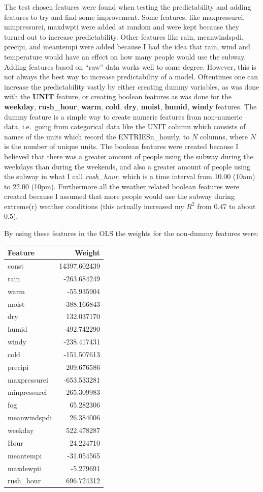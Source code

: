 \documentclass{article}
\begin{document}
The test chosen features were found when testing the predictability and
adding features to try and find some improvement. Some features, like
maxpressurei, minpressurei, maxdwpti were added at random and were kept
because they turned out to increase predictability. Other features like
rain, meanwindspdi, precipi, and meantempi were added because I had the
idea that rain, wind and temperature would have an effect on how many
people would use the subway. Adding features based on ``raw'' data works
well to some degree. However, this is not always the best way to
increase predictability of a model. Oftentimes one can increase the
predictability vastly by either creating dummy variables, as was done
with the \textbf{UNIT} feature, or creating boolean features as was done
for the \textbf{weekday}, \textbf{rush\_hour}, \textbf{warm},
\textbf{cold}, \textbf{dry}, \textbf{moist}, \textbf{humid},
\textbf{windy} features. The dummy feature is a simple way to create
numeric features from non-numeric data, i.e.~going from categorical data
like the UNIT column which consists of names of the units which record
the ENTRIESn\_hourly, to \(N\) columns, where \(N\) is the number of
unique units. The boolean features were created because I believed that
there was a greater amount of people using the subway during the
weekdays than during the weekends, and also a greater amount of people
using the subway in what I call \emph{rush\_hour}, which is a time
interval from 10.00 (10am) to 22.00 (10pm). Furthermore all the weather
related boolean features were created because I assumed that more people
would use the subway during extreme(r) weather conditions (this actually
increased my \(R^2\) from 0.47 to about 0.5).

By using these features in the OLS the weights for the non-dummy
features were:

\begin{longtable}[c]{@{}lr@{}}
\toprule
Feature & Weight\tabularnewline
\midrule
\endhead
const & 14397.602439\tabularnewline
rain & -263.684249\tabularnewline
warm & -55.935904\tabularnewline
moist & 388.166843\tabularnewline
dry & 132.037170\tabularnewline
humid & -492.742290\tabularnewline
windy & -238.417431\tabularnewline
cold & -151.507613\tabularnewline
precipi & 209.676586\tabularnewline
maxpressurei & -653.533281\tabularnewline
minpressurei & 265.309983\tabularnewline
fog & 65.282306\tabularnewline
meanwindspdi & 26.384006\tabularnewline
weekday & 522.478287\tabularnewline
Hour & 24.224710\tabularnewline
meantempi & -31.054565\tabularnewline
maxdewpti & -5.279691\tabularnewline
rush\_hour & 696.724312\tabularnewline
\bottomrule
\end{longtable}
\end{document}
